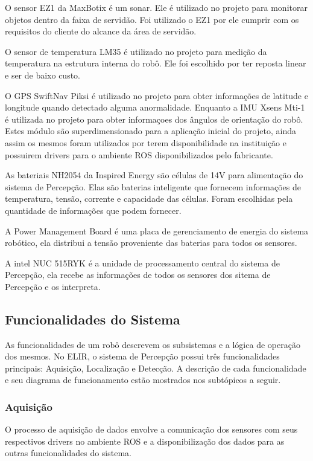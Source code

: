 O sensor EZ1 da MaxBotix é um sonar. Ele é utilizado no projeto para monitorar objetos dentro da faixa de servidão. Foi utilizado o EZ1 por ele cumprir com os requisitos do cliente do alcance da área de servidão.

O sensor de temperatura LM35 é utilizado no projeto para medição da temperatura na estrutura interna do robô. Ele foi escolhido por ter reposta linear e ser de baixo custo.

O GPS SwiftNav Piksi é utilizado no projeto para obter informações de latitude e longitude quando detectado alguma anormalidade. Enquanto a IMU Xsens Mti-1 é utilizada no projeto para obter informaçoes dos ângulos de orientação do robô. Estes módulo são superdimensionado para a aplicação inicial do projeto, ainda assim os mesmos foram utilizados por terem disponibilidade na instituição e possuirem drivers para o ambiente ROS disponibilizados pelo fabricante.

As bateriais NH2054 da Inspired Energy são células de 14V para alimentação do sistema de Percepção. Elas são baterias inteligente que fornecem informações de temperatura, tensão, corrente e capacidade das células. Foram escolhidas pela quantidade de informações que podem fornecer.

A Power Management Board é uma placa de gerenciamento de energia do sistema robótico, ela distribui a tensão proveniente das baterias para todos os sensores. 

A intel NUC 515RYK é a unidade de processamento central do sistema de Percepção, ela recebe as informações de todos os sensores dos sitema de Percepção e os interpreta. 



\subsection{Funcionalidades do Sistema}


As funcionalidades de um robô descrevem os subsistemas e a lógica de operação dos mesmos. No ELIR, o sistema de Percepção possui três funcionalidades principais: Aquisição, Localização e Detecção. A descrição de cada funcionalidade e seu diagrama de funcionamento estão mostrados nos subtópicos a seguir. 

\subsubsection{Aquisição}
\label{ssec:func1}

O processo de aquisição de dados envolve a comunicação dos sensores com seus respectivos drivers no ambiente ROS e a disponibilização dos dados para as outras funcionalidades do sistema.

